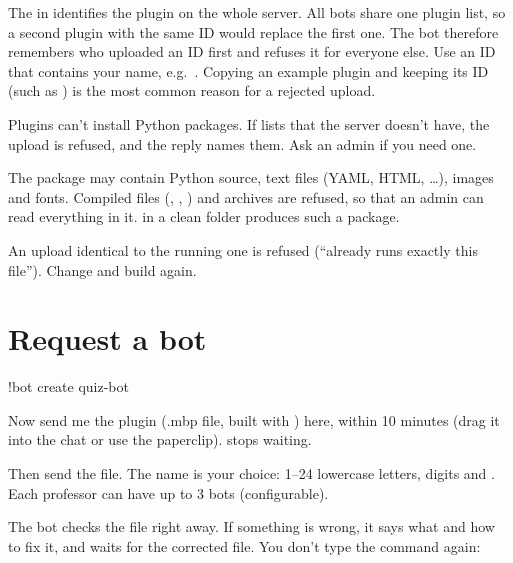 \begin{description}[style=nextline,leftmargin=1.5em,font=\normalfont\bfseries]
  \item[The plugin ID must be your own]
    The  in  identifies the plugin on the whole server. All bots
    share one plugin list, so a second plugin with the same ID would replace the first one.
    The bot therefore remembers who uploaded an ID first and refuses it for everyone else.
    Use an ID that contains your name, e.g.\ . Copying an
    example plugin and keeping its ID (such as ) is the most common
    reason for a rejected upload.
  \item[Only packages that come with maubot]
    Plugins can't install Python packages. If  lists 
    that the server doesn't have, the upload is refused, and the reply names them. Ask an
    admin if you need one.
  \item[Only source code in the package]
    The package may contain Python source, text files (YAML, HTML, \dots), images and fonts.
    Compiled files (, , ) and archives are refused, so
    that an admin can read everything in it.  in a clean folder produces such
    a package.
  \item[Raise the version for every update]
    An upload identical to the running one is refused (\enquote{already runs exactly this
    file}). Change  and build again.
\end{description}

\section{Request a bot}

\begin{you}
!bot create quiz-bot
\end{you}
\begin{botreply}
Now send me the plugin (.mbp file, built with ) here, within 10 minutes (drag
it into the chat or use the paperclip).  stops waiting.
\end{botreply}

Then send the  file. The name is your choice: 1--24 lowercase letters, digits and
\cmd{-}. Each professor can have up to 3 bots (configurable).

The bot checks the file right away. If something is wrong, it says what and how to fix it,
and waits for the corrected file. You don't type the command again:

